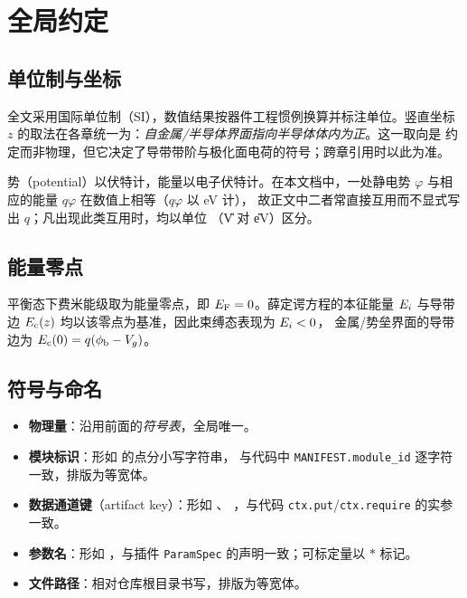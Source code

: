 
\chapter*{全局约定}

\section*{单位制与坐标}

全文采用国际单位制（SI），数值结果按器件工程惯例换算并标注单位。竖直坐标 $z$
的取法在各章统一为：\emph{自金属/半导体界面指向半导体体内为正}。这一取向是
约定而非物理，但它决定了导带带阶与极化面电荷的符号；跨章引用时以此为准。

势（potential）以伏特计，能量以电子伏特计。在本文档中，一处静电势
$\varphi$ 与相应的能量 $q\varphi$ 在数值上相等（$q\varphi$ 以 eV 计），
故正文中二者常直接互用而不显式写出 $q$；凡出现此类互用时，均以单位
（\U{V} 对 \U{eV}）区分。

\section*{能量零点}

平衡态下费米能级取为能量零点，即 $E_{\mathrm{F}}=0$。薛定谔方程的本征能量 $E_{i}$
与导带边 $E_{\mathrm{c}}(z)$ 均以该零点为基准，因此束缚态表现为 $E_{i}<0$，
金属/势垒界面的导带边为 $E_{\mathrm{c}}(0)=q(\phi_{\mathrm{b}}-V_g)$。

\section*{符号与命名}

\begin{itemize}[leftmargin=1.7em,itemsep=0.25em,topsep=0.3em]
  \item \textbf{物理量}：沿用前面的\emph{符号表}，全局唯一。
  \item \textbf{模块标识}：形如  的点分小写字符串，
        与代码中 \texttt{MANIFEST.module\_id} 逐字符一致，排版为等宽体。
  \item \textbf{数据通道键}（artifact key）：形如 、
        ，与代码 \texttt{ctx.put}/\texttt{ctx.require} 的实参一致。
  \item \textbf{参数名}：形如 ，与插件 \texttt{ParamSpec}
        的声明一致；可标定量以 $\ast$ 标记。
  \item \textbf{文件路径}：相对仓库根目录书写，排版为等宽体。
\end{itemize}

